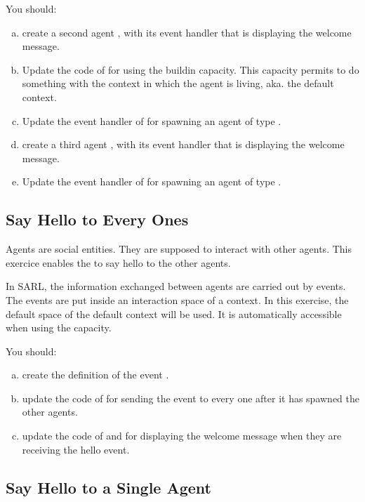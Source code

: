 \documentclass[article,english,nodocumentinfo]{utbmciadreport}
\begin{document}
You should:
\begin{enumerate}[a)]
\item create a second agent , with its  event handler that is displaying the welcome message.
\item Update the code of  for using the  buildin capacity. This capacity permits to do something with the context in which the agent is living, aka. the default context.
\item Update the  event handler of  for spawning an agent of type .
\item create a third agent , with its  event handler that is displaying the welcome message.
\item Update the  event handler of  for spawning an agent of type .
\end{enumerate}

\subsection{Say Hello to Every Ones}

Agents are social entities. They are supposed to interact with other agents.
This exercice enables the  to say hello to the other agents.

In SARL, the information exchanged between agents are carried out by events.
The events are put inside an interaction space of a context.
In this exercise, the default space of the default context will be used.
It is automatically accessible when using the  capacity.

You should:
\begin{enumerate}[a)]
\item create the definition of the event .
\item update the code of  for sending the event to every one after it has spawned the other agents.
\item update the code of  and  for displaying the welcome message when they are receiving the hello event.
\end{enumerate}

\subsection{Say Hello to a Single Agent}
\end{document}
